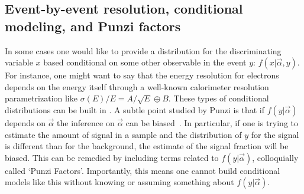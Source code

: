 \subsection{Event-by-event resolution, conditional modeling, and Punzi factors}


In some cases one would like to provide a distribution for the discriminating variable $x$ based conditional on some other observable in the event $y$: $f(x|\vec\alpha,y)$.  For instance, one might want to say that the energy resolution for electrons depends on the energy itself through a well-known calorimeter resolution parametrization like $\sigma(E)/E = A/\sqrt{E}\oplus B$.  These types of conditional distributions can be built in \roofit.  A subtle point studied by Punzi is that if $f(y|\vec\alpha)$ depends on $\vec\alpha$ the inference on $\vec\alpha$ can be biased~\cite{Punzi:2004wh}.  In particular, if one is trying to estimate the amount of signal in a sample and the distribution of $y$ for the signal is different than for the background, the estimate of the signal fraction will be biased.  This can be remedied by including terms related to $f(y|\vec\alpha)$, colloquially called `Punzi Factors'.  Importantly, this means one cannot build conditional models like this without knowing or assuming something about $f(y|\vec\alpha)$.
